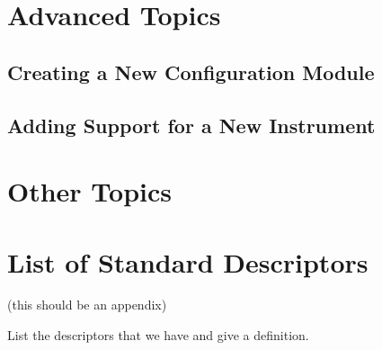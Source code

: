 \documentclass[letterpaper,10pt,english]{sphinxmanual}
\begin{document}
\chapter{Advanced Topics}
\label{advanced:advanced-topics}\label{advanced::doc}

\section{Creating a New Configuration Module}
\label{advanced:creating-a-new-configuration-module}

\section{Adding Support for a New Instrument}
\label{advanced:adding-support-for-a-new-instrument}

\chapter{Other Topics}
\label{other:other-topics}\label{other::doc}

\chapter{List of Standard Descriptors}
\label{descriptors:list-of-standard-descriptors}\label{descriptors::doc}
(this should be an appendix)

List the descriptors that we have and give a definition.



\renewcommand{\indexname}{Index}
\printindex
\end{document}
